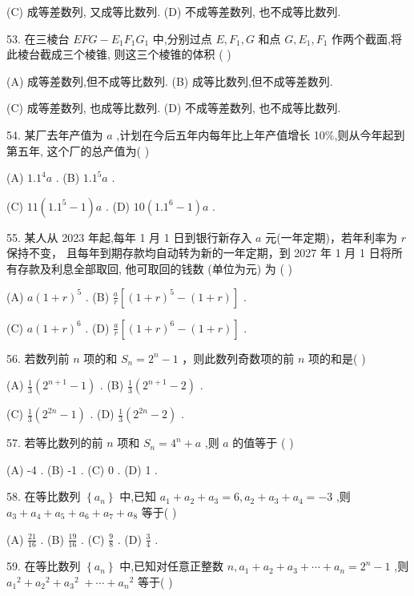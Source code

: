 \documentclass[10pt]{article}
\begin{document}
(C) 成等差数列, 又成等比数列. (D) 不成等差数列, 也不成等比数列.

53. 在三棱台 \({EFG} - {E}_{1}{F}_{1}{G}_{1}\) 中,分别过点 \(E,{F}_{1},G\) 和点 \(G,{E}_{1},{F}_{1}\) 作两个截面,将此棱台截成三个棱锥, 则这三个棱锥的体积 ( )

(A) 成等差数列,但不成等比数列. (B) 成等比数列,但不成等差数列.

(C) 成等差数列, 也成等比数列. (D) 不成等差数列, 也不成等比数列.

54. 某厂去年产值为 \(a\) ,计划在今后五年内每年比上年产值增长 10\%,则从今年起到第五年, 这个厂的总产值为( )

(A) \({1.1}^{4}a\) . (B) \({1.1}^{5}a\) .

(C) \({11}\left( {{1.1}^{5} - 1}\right) a\) . (D) \({10}\left( {{1.1}^{6} - 1}\right) a\) .

55. 某人从 2023 年起,每年 1 月 1 日到银行新存入 \(a\) 元(一年定期)，若年利率为 \(r\) 保持不变， 且每年到期存款均自动转为新的一年定期，到 2027 年 1 月 1 日将所有存款及利息全部取回, 他可取回的钱数 (单位为元) 为 ( )

(A) \(a{\left( 1 + r\right) }^{5}\) . (B) \(\frac{a}{r}\left\lbrack  {{\left( 1 + r\right) }^{5} - \left( {1 + r}\right) }\right\rbrack\) .

(C) \(a{\left( 1 + r\right) }^{6}\) . (D) \(\frac{a}{r}\left\lbrack  {{\left( 1 + r\right) }^{6} - \left( {1 + r}\right) }\right\rbrack\) .

56. 若数列前 \(n\) 项的和 \({S}_{n} = {2}^{n} - 1\) ，则此数列奇数项的前 \(n\) 项的和是( )

(A) \(\frac{1}{3}\left( {{2}^{n + 1} - 1}\right)\) . (B) \(\frac{1}{3}\left( {{2}^{n + 1} - 2}\right)\) .

(C) \(\frac{1}{3}\left( {{2}^{2n} - 1}\right)\) . (D) \(\frac{1}{3}\left( {{2}^{2n} - 2}\right)\) .

57. 若等比数列的前 \(n\) 项和 \({S}_{n} = {4}^{n} + a\) ,则 \(a\) 的值等于 ( )

(A) -4 . (B) -1 . (C) 0 . (D) 1 .

58. 在等比数列 \(\left\{  {a}_{n}\right\}\) 中,已知 \({a}_{1} + {a}_{2} + {a}_{3} = 6,{a}_{2} + {a}_{3} + {a}_{4} =  - 3\) ,则 \({a}_{3} + {a}_{4} + {a}_{5} + {a}_{6} + {a}_{7} + {a}_{8}\) 等于( )

(A) \(\frac{21}{16}\) . (B) \(\frac{19}{16}\) . (C) \(\frac{9}{8}\) . (D) \(\frac{3}{4}\) .

59. 在等比数列 \(\left\{  {a}_{n}\right\}\) 中,已知对任意正整数 \(n,{a}_{1} + {a}_{2} + {a}_{3} + \cdots  + {a}_{n} = {2}^{n} - 1\) ,则 \({a}_{1}{}^{2} + {a}_{2}{}^{2} + {a}_{3}{}^{2} \; + \cdots  + {a}_{n}{}^{2}\) 等于( )
\end{document}
